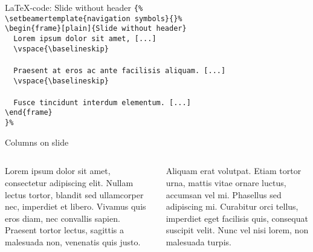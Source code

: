 \toggleslidecolors
\begin{frame}[fragile]{\LaTeX-code: Slide without header}
\footnotesize
\verb|{%|\\
\verb|\setbeamertemplate{navigation symbols}{}%|\\
\verb|\begin{frame}[plain]{Slide without header}|\\
\verb|  Lorem ipsum dolor sit amet, [...]|\\
\verb|  \vspace{\baselineskip}|\\
\verb||\\
\verb|  Praesent at eros ac ante facilisis aliquam. [...]|\\
\verb|  \vspace{\baselineskip}|\\
\verb||\\
\verb|  Fusce tincidunt interdum elementum. [...]|\\
\verb|\end{frame}|\\
\verb|}%|\\
\end{frame}
\toggleslidecolors


\begin{frame}{Columns on slide}
\begin{columns}
\begin{column}{.45\textwidth}
Lorem ipsum dolor sit amet, consectetur adipiscing elit. Nullam lectus tortor, blandit sed ullamcorper nec, imperdiet et libero. Vivamus quis eros diam, nec convallis sapien. Praesent tortor lectus, sagittis a malesuada non, venenatis quis justo.
\end{column}
\begin{column}{.45\textwidth}
Aliquam erat volutpat. Etiam tortor urna, mattis vitae ornare luctus, accumsan vel mi. Phasellus sed adipiscing mi. Curabitur orci tellus, imperdiet eget facilisis quis, consequat suscipit velit. Nunc vel nisi lorem, non malesuada turpis.
\end{column}
\end{columns}
\end{frame}

